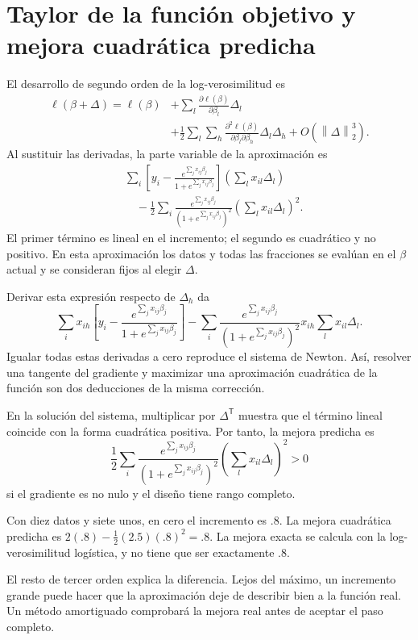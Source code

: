 \documentclass[11pt,a4paper]{article}
\newcommand{\T}{^{\mathsf T}}
\newcommand{\norm}[1]{\left\lVert #1\right\rVert}
\begin{document}
\section{Taylor de la función objetivo y mejora cuadrática predicha}\label{logit42}
El desarrollo de segundo orden de la log-verosimilitud es
\[
\begin{aligned}
\ell(\beta+\Delta)=\ell(\beta)
&+\sum_l\frac{\partial\ell(\beta)}{\partial\beta_l}\Delta_l\\
&+\frac12\sum_l\sum_h
\frac{\partial^2\ell(\beta)}{\partial\beta_l\partial\beta_h}
\Delta_l\Delta_h+O(\norm\Delta_2^3).
\end{aligned}
\]
Al sustituir las derivadas, la parte variable de la aproximación es
\[
\begin{aligned}
&\sum_i\left[y_i-
\frac{e^{\sum_jx_{ij}\beta_j}}{1+e^{\sum_jx_{ij}\beta_j}}\right]
\left(\sum_lx_{il}\Delta_l\right)\\
&\quad-\frac12\sum_i
\frac{e^{\sum_jx_{ij}\beta_j}}{(1+e^{\sum_jx_{ij}\beta_j})^2}
\left(\sum_lx_{il}\Delta_l\right)^2.
\end{aligned}
\]
El primer término es lineal en el incremento; el segundo es cuadrático
y no positivo. En esta aproximación los datos y todas las fracciones
se evalúan en el $\beta$ actual y se consideran fijos al elegir $\Delta$.

Derivar esta expresión respecto de $\Delta_h$ da
\[
\sum_i x_{ih}\left[y_i-
\frac{e^{\sum_jx_{ij}\beta_j}}{1+e^{\sum_jx_{ij}\beta_j}}\right]
-\sum_i
\frac{e^{\sum_jx_{ij}\beta_j}}{(1+e^{\sum_jx_{ij}\beta_j})^2}
x_{ih}\sum_lx_{il}\Delta_l.
\]
Igualar todas estas derivadas a cero reproduce el sistema de Newton.
Así, resolver una tangente del gradiente y maximizar una aproximación
cuadrática de la función son dos deducciones de la misma corrección.

En la solución del sistema, multiplicar por $\Delta\T$ muestra
que el término lineal coincide con la forma cuadrática positiva.
Por tanto, la mejora predicha es
\[
\frac12\sum_i
\frac{e^{\sum_jx_{ij}\beta_j}}{(1+e^{\sum_jx_{ij}\beta_j})^2}
\left(\sum_lx_{il}\Delta_l\right)^2>0
\]
si el gradiente es no nulo y el diseño tiene rango completo.

\begin{ejemplo}
Con diez datos y siete unos, en cero el incremento es $.8$.
La mejora cuadrática predicha es
$2(.8)-\tfrac12(2.5)(.8)^2=.8$.
La mejora exacta se calcula con la log-verosimilitud logística,
y no tiene que ser exactamente $.8$.
\end{ejemplo}
El resto de tercer orden explica la diferencia.
Lejos del máximo, un incremento grande puede hacer que la
aproximación deje de describir bien a la función real.
Un método amortiguado comprobará la mejora real antes de aceptar
el paso completo.
\end{document}
